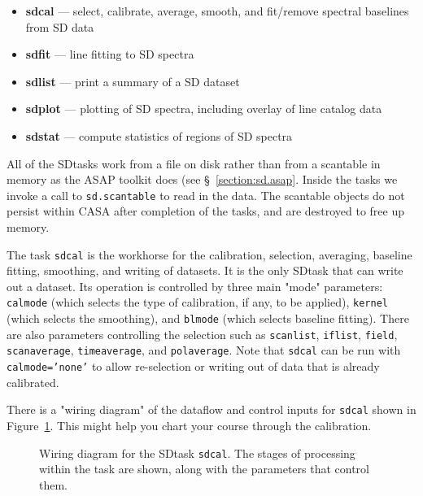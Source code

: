 \begin{itemize}

\item {\bf sdcal} --- select, calibrate, average, smooth, and 
fit/remove spectral baselines from SD data

\item {\bf sdfit} --- line fitting to SD spectra

\item {\bf sdlist} --- print a summary of a SD dataset

\item {\bf sdplot} --- plotting of SD spectra, including overlay of line
catalog data

\item {\bf sdstat} --- compute statistics of regions of SD spectra

\end{itemize}

All of the SDtasks work from a file on disk rather than from
a scantable in memory as the ASAP toolkit does (see 
\S~\ref{section:sd.asap}.  Inside the tasks we invoke a call
to {\tt sd.scantable} to read in the data.  The scantable objects
do not persist within CASA after completion of the tasks, and
are destroyed to free up memory.

The task {\tt sdcal} is the workhorse for the calibration, selection,
averaging, baseline fitting, smoothing, and writing of datasets.  It
is the only SDtask that can write out a dataset.  Its operation is
controlled by three main "mode" parameters: {\tt calmode} (which selects
the type of calibration, if any, to be applied), {\tt kernel} (which selects
the smoothing), and {\tt blmode} (which selects baseline fitting).  There
are also parameters controlling the selection such as {\tt scanlist}, 
{\tt iflist}, {\tt field}, {\tt scanaverage}, {\tt timeaverage}, and
{\tt polaverage}.  Note that {\tt sdcal} can be
run with {\tt calmode='none'} to allow re-selection or writing out of data
that is already calibrated.

There is a "wiring diagram" of the dataflow and control inputs for
{\tt sdcal} shown in Figure~\ref{fig:sdcal}.  This might help 
you chart your course through the calibration.

\begin{figure}[h!]
\caption{\label{fig:sdcal} Wiring diagram for the SDtask {\tt sdcal}.
The stages of processing within the task are shown, along with the
parameters that control them. }
\hrulefill
\end{figure}

